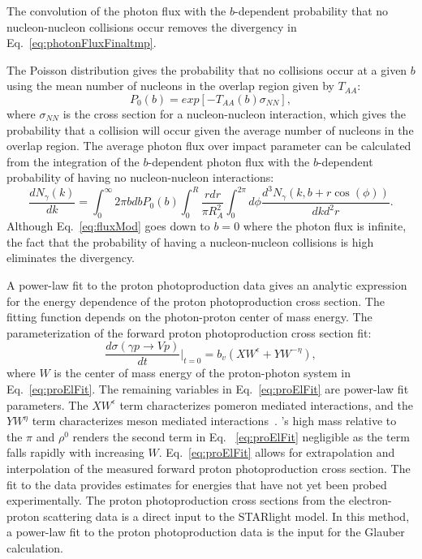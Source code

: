    The convolution of the photon flux with the $b$-dependent probability that 
      no nucleon-nucleon collisions occur removes the divergency in 
      Eq.~\ref{eq:photonFluxFinaltmp}. 
     
    The Poisson distribution gives the probability that no collisions 
      occur at a given $b$ using the mean number of nucleons in the overlap 
      region given by $T_{AA}$:
    \begin{equation} \label{eg:poisNoCol}
      P_{0}(b)=exp[-T_{AA}(b)\sigma_{NN}],
    \end{equation}
    where $\sigma_{NN}$ is the cross section for a 
      nucleon-nucleon interaction, which gives the probability that a collision
      will occur given the average number of nucleons in the overlap region.
    The average photon flux over impact parameter can be calculated 
      from the integration of the $b$-dependent photon flux 
      with the $b$-dependent probability of having no nucleon-nucleon 
      interactions: 
    \begin{equation} \label{eq:fluxMod}
      \frac{dN_{\gamma}(k)}{dk}=\int_{0}^{\infty}{2\pi bdbP_{0}(b)
         \int_{0}^{R}{\frac{rdr}{\pi R^{2}_{A}}\int_{0}^{2\pi}d\phi
         \frac{d^{3}N_{\gamma}(k,b+r\cos(\phi))}{dkd^{2}r}}}.
    \end{equation}
    Although Eq.~\ref{eq:fluxMod} goes down to $b=0$ where the photon flux is 
      infinite, the fact that the probability of having a nucleon-nucleon collisions is 
      high eliminates the divergency.

    A power-law fit to the proton photoproduction data gives an analytic 
      expression for the energy dependence of the proton photoproduction 
      cross section.
    The fitting function depends on the photon-proton center of mass energy. 
    The parameterization of the forward proton photoproduction cross section 
      fit:
    \begin{equation} \label{eq:proElFit}
      \frac{d\sigma(\gamma p\rightarrow Vp)}{dt}\Big|_{t=0}
        =b_{v}(XW^{\epsilon}+YW^{-\eta}),
    \end{equation}
    where $W$ is the center of mass energy of the proton-photon system in 
      Eq.~\ref{eq:proElFit}.
    The remaining variables in Eq.~\ref{eq:proElFit} are power-law fit 
      parameters.  
    The $XW^{\epsilon}$ term characterizes pomeron mediated interactions, and
      the $YW^{\eta}$ term characterizes meson mediated interactions~\cite{vmd1999}. 
    \JPsi{}'s high mass relative to the $\pi$ and $\rho^{0}$ renders the second 
      term in Eq. ~\ref{eq:proElFit} negligible as the term falls rapidly with
      increasing $W$. 
    Eq.~\ref{eq:proElFit} allows for extrapolation and interpolation of the 
      measured forward proton photoproduction cross section. 
    The fit to the data provides estimates for energies that have not yet been 
      probed experimentally.
    The proton photoproduction cross sections from the electron-proton 
      scattering data is a direct input to the STARlight model. 
    In this method, a power-law fit to the proton photoproduction data is the 
      input for the Glauber calculation. 

